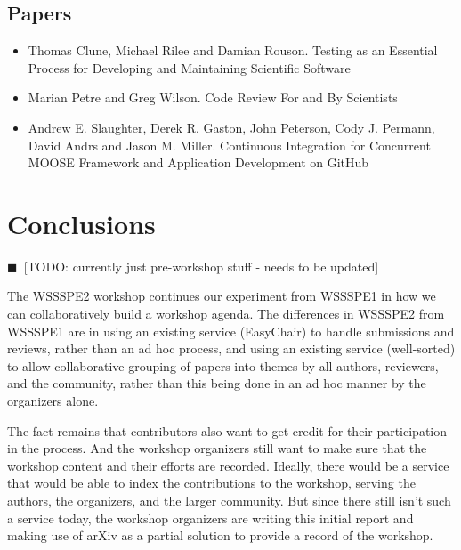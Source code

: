 \documentclass[11pt, oneside]{amsart}
\newcommand{\todo}[1]{{\color{blue}$\blacksquare$~\textsf{[TODO: #1]}}}
\begin{document}
\subsection{Papers}

\begin{itemize}
\item Thomas Clune, Michael Rilee and Damian Rouson. Testing as an Essential
Process for Developing and Maintaining Scientific Software~\cite{wssspe2_clune}

\item Marian Petre and Greg Wilson. Code Review For and By
Scientists~\cite{wssspe2_petre}

\item Andrew E. Slaughter, Derek R. Gaston, John Peterson, Cody J. Permann,
David Andrs and Jason M. Miller. Continuous Integration for Concurrent {MOOSE}
Framework and Application Development on {GitHub}~\cite{wssspe2_slaughter}
\end{itemize}

\section{Conclusions}
\todo{currently just pre-workshop stuff - needs to be updated}

The WSSSPE2 workshop continues our experiment from WSSSPE1 in how we can
collaboratively build a workshop agenda. The differences in WSSSPE2 from WSSSPE1
are in using an existing service (EasyChair) to handle submissions and reviews,
rather than an ad hoc process, and using an existing service (well-sorted) to
allow collaborative grouping of papers into themes by all authors, reviewers,
and the community, rather than this being done in an ad hoc manner by the
organizers alone.

The fact remains that contributors also want to get credit for their
participation in the process. And the workshop organizers still want to make
sure that the workshop content and their efforts are recorded. Ideally, there
would be a service that would be able to index the contributions to the
workshop, serving the authors, the organizers, and the larger community. But
since there still isn't such a service today, the workshop organizers are
writing this initial report and making use of arXiv as a partial solution to
provide a record of the workshop.
\end{document}
